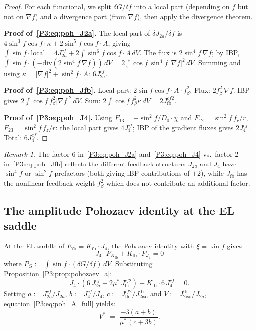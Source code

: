 \documentclass[11pt,a4paper]{article}
\theoremstyle{definition}
\theoremstyle{remark}
\newtheorem{remark}[theorem]{Remark}
\newcommand{\Kfb}{K_{\mathrm{fb}}}
\newcommand{\Jfb}{J_{2\mathrm{iso}}^{\mathrm{fb}}}
\newcommand{\Ja}{J_{2a}}
\newcommand{\Jfour}{J_{4}}
\newcommand{\kk}{\kappa}
\begin{document}
\begin{proof}
For each functional, we split $\delta G/\delta f$ into a local part
(depending on $f$ but not on $\nabla f$) and a divergence part (from
$\nabla f$), then apply the divergence theorem.

\textbf{Proof of~\eqref{P3:eq:poh_J2a}.}
The local part of $\delta J_{2a}/\delta f$ is
$4\sin^3\!f\cos f\cdot\kk + 2\sin^5\!f\cos f\cdot A$,
giving $\int\!\sin f\cdot\text{local} = 4J_{2a}^{cf} + 2\int\!\sin^6\!f\cos f\cdot A\,dV$.
The flux is $2\sin^4\!f\,\nabla f$; by IBP,
$\int\!\sin f\cdot(-\mathrm{div}(2\sin^4\!f\,\nabla f))\,dV
= 2\int\!\cos f\,\sin^4\!f\,|\nabla f|^2\,dV$.
Summing and using $\kk = |\nabla f|^2 + \sin^2\!f\cdot A$:
$6J_{2a}^{cf}$.

\textbf{Proof of~\eqref{P3:eq:poh_Jfb}.}
Local part: $2\sin f\cos f\cdot A\cdot f_\beta^2$.
Flux: $2f_\beta^2\,\nabla f$.  IBP gives $2\int\!\cos f\,f_\beta^2|\nabla f|^2\,dV$.
Sum: $2\int\!\cos f\,f_\beta^2\kk\,dV = 2J_{\mathrm{fb}}^{cf2}$.

\textbf{Proof of~\eqref{P3:eq:poh_J4}.}
Using $F_{13}=-\sin^2\!f/D_0\cdot\chi$ and $F_{12}=\sin^2\!f\,f_r/r$,
$F_{23}=\sin^2\!f\,f_z/r$: the local part gives $4J_4^{cf}$;
IBP of the gradient fluxes gives $2J_4^{cf}$.  Total: $6J_4^{cf}$.
\end{proof}

\begin{remark}
\label{P3:rem:factor6_vs_2}
The factor 6 in~\eqref{P3:eq:poh_J2a} and~\eqref{P3:eq:poh_J4} vs.\ factor 2
in~\eqref{P3:eq:poh_Jfb} reflects the different feedback structure:
$J_{2a}$ and $J_4$ have $\sin^4\!f$ or $\sin^2\!f$ prefactors (both
giving IBP contributions of $+2$), while $J_{\mathrm{fb}}$ has the
nonlinear feedback weight $f_\beta^2$ which does not contribute an
additional factor.
\end{remark}

\subsection{The amplitude Pohozaev identity at the EL saddle}

At the EL saddle of $E_{\mathrm{fb}} = \Kfb\cdot\Jfour$,
the Pohozaev identity with $\xi = \sin f$ gives
\begin{equation}
  \Jfour\cdot P_{\Kfb} + \Kfb\cdot P_{\Jfour} = 0
  \label{P3:eq:pohozaev_efb}
\end{equation}
where $P_G := \int\!\sin f\cdot(\delta G/\delta f)\,dV$.
Substituting Proposition~\ref{P3:prop:pohozaev_a}:
\begin{equation}
  \Jfour\cdot(6\,J_{2a}^{cf} + 2\mu^*\,J_{\mathrm{fb}}^{cf2})
  + \Kfb\cdot 6\,J_4^{cf} = 0.
  \label{P3:eq:poh_A_full}
\end{equation}
Setting $a := J_{2a}^{cf}/\Ja$, $b := J_4^{cf}/\Jfour$,
$c := J_{\mathrm{fb}}^{cf2}/\Jfb$ and $V := \Jfb/\Ja$,
equation~\eqref{P3:eq:poh_A_full} yields:
\begin{equation}
  V^* \;=\; \frac{-3(a+b)}{\mu^*\,(c+3b)}.
  \label{P3:eq:V_from_poh_A}
\end{equation}
\end{document}

